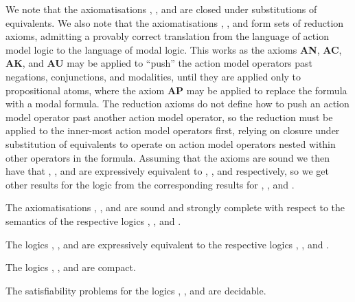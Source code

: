 We note that the axiomatisations \axiomAmlK{}, \axiomAmlKFF{}, and \axiomAmlS{} are closed under substitutions of equivalents.
We also note that the axiomatisations \axiomAmlK{}, \axiomAmlKFF{}, and \axiomAmlS{} form sets of reduction axioms, admitting a provably correct translation from the language \langAml{} of action model logic to the language \langMl{} of modal logic.
This works as the axioms {\bf AN}, {\bf AC}, {\bf AK}, and {\bf AU} may be applied to ``push'' the action model operators past negations, conjunctions, and modalities, until they are applied only to propositional atoms, where the axiom {\bf AP} may be applied to replace the formula with a modal formula.
The reduction axioms do not define how to push an action model operator past another action model operator, so the reduction must be applied to the inner-most action model operators first, relying on closure under substitution of equivalents to operate on action model operators nested within other operators in the formula.
Assuming that the axioms are sound we then have that \logicAmlK{}, \logicAmlKFF{}, and \logicAmlS{} are expressively equivalent to \logicK{}, \logicKFF{}, and \logicS{} respectively, so we get other results for the logic from the corresponding results for \logicK{}, \logicKFF{}, and \logicS{}.

\begin{proposition}
The axiomatisations \axiomAmlK{}, \axiomAmlKFF{}, and \axiomAmlS{} are sound and strongly complete with respect to the semantics of the respective logics \logicAmlK{}, \logicAmlKFF{}, and \logicAmlS{}.
\end{proposition}

\begin{proposition}\label{aml-expressive-equivalence}
The logics \logicAmlK{}, \logicAmlKFF{}, and \logicAmlS{} are expressively equivalent to the respective logics \logicK{}, \logicKFF{}, and \logicS{}.
\end{proposition}

\begin{proposition}
The logics \logicAmlK{}, \logicAmlKFF{}, and \logicAmlS{} are compact.
\end{proposition}

\begin{proposition}
The satisfiability problems for the logics \logicAmlK{}, \logicAmlKFF{}, and \logicAmlS{} are decidable.
\end{proposition}
